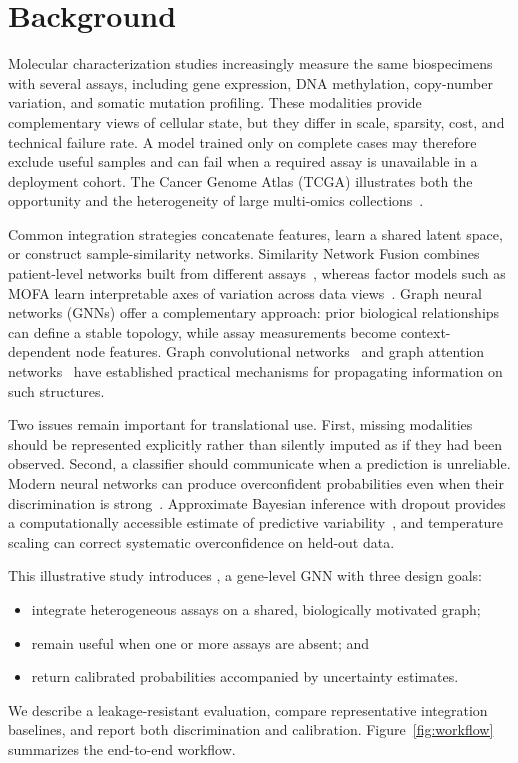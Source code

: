 \section{Background}

Molecular characterization studies increasingly measure the same biospecimens
with several assays, including gene expression, DNA methylation, copy-number
variation, and somatic mutation profiling. These modalities provide complementary
views of cellular state, but they differ in scale, sparsity, cost, and technical
failure rate. A model trained only on complete cases may therefore exclude useful
samples and can fail when a required assay is unavailable in a deployment
cohort. The Cancer Genome Atlas (TCGA) illustrates both the opportunity and the
heterogeneity of large multi-omics collections~\cite{weinstein2013tcga}.

Common integration strategies concatenate features, learn a shared latent space,
or construct sample-similarity networks. Similarity Network Fusion combines
patient-level networks built from different assays~\cite{wang2014snf}, whereas
factor models such as MOFA learn interpretable axes of variation across data
views~\cite{argelaguet2018mofa}. Graph neural networks (GNNs) offer a complementary
approach: prior biological relationships can define a stable topology, while
assay measurements become context-dependent node features. Graph convolutional
networks~\cite{kipf2017gcn} and graph attention networks~\cite{velickovic2018gat}
have established practical mechanisms for propagating information on such
structures.

Two issues remain important for translational use. First, missing modalities
should be represented explicitly rather than silently imputed as if they had
been observed. Second, a classifier should communicate when a prediction is
unreliable. Modern neural networks can produce overconfident probabilities even
when their discrimination is strong~\cite{guo2017calibration}. Approximate
Bayesian inference with dropout provides a computationally accessible estimate
of predictive variability~\cite{gal2016dropout}, and temperature scaling can
correct systematic overconfidence on held-out data.

This illustrative study introduces \modelname, a gene-level GNN with three design
goals:
\begin{itemize}
  \item integrate heterogeneous assays on a shared, biologically motivated graph;
  \item remain useful when one or more assays are absent; and
  \item return calibrated probabilities accompanied by uncertainty estimates.
\end{itemize}
We describe a leakage-resistant evaluation, compare representative integration
baselines, and report both discrimination and calibration. Figure~\ref{fig:workflow}
summarizes the end-to-end workflow.

